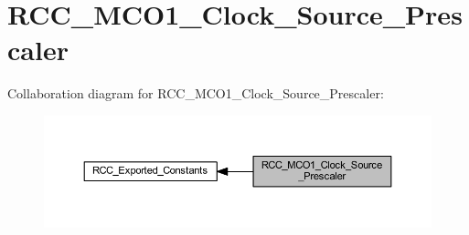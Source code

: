 \hypertarget{group___r_c_c___m_c_o1___clock___source___prescaler}{}\section{R\+C\+C\+\_\+\+M\+C\+O1\+\_\+\+Clock\+\_\+\+Source\+\_\+\+Prescaler}
\label{group___r_c_c___m_c_o1___clock___source___prescaler}
Collaboration diagram for R\+C\+C\+\_\+\+M\+C\+O1\+\_\+\+Clock\+\_\+\+Source\+\_\+\+Prescaler\+:
\nopagebreak
\begin{figure}[H]
\begin{center}
\leavevmode
\includegraphics[width=350pt]{group___r_c_c___m_c_o1___clock___source___prescaler}
\end{center}
\end{figure}
